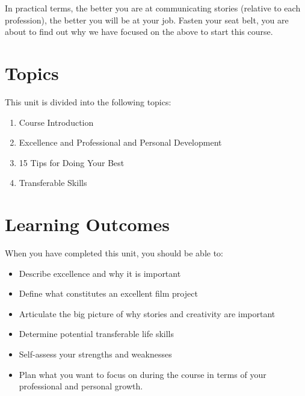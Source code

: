 \documentclass[
]{book}
\providecommand{\tightlist}{%
  \setlength{\itemsep}{0pt}\setlength{\parskip}{0pt}}
\begin{document}
In practical terms, the better you are at communicating stories (relative to each profession), the better you will be at your job. Fasten your seat belt, you are about to find out why we have focused on the above to start this course.

\hypertarget{topics}{%
\section*{Topics}\label{topics}}

This unit is divided into the following topics:

\begin{enumerate}
\def\labelenumi{\arabic{enumi}.}
\tightlist
\item
  Course Introduction\\
\item
  Excellence and Professional and Personal Development\\
\item
  15 Tips for Doing Your Best\\
\item
  Transferable Skills
\end{enumerate}

\hypertarget{learning-outcomes}{%
\section*{Learning Outcomes}\label{learning-outcomes}}

When you have completed this unit, you should be able to:

\begin{itemize}
\tightlist
\item
  Describe excellence and why it is important\\
\item
  Define what constitutes an excellent film project\\
\item
  Articulate the big picture of why stories and creativity are important\\
\item
  Determine potential transferable life skills\\
\item
  Self-assess your strengths and weaknesses\\
\item
  Plan what you want to focus on during the course in terms of your professional and personal growth.
\end{itemize}
\end{document}
